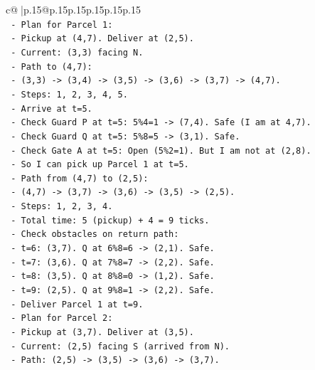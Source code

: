 \documentclass{article}
\begin{document}
{\begin{supertabular}{c@{$\;$}|p{.15\linewidth}@{}p{.15\linewidth}p{.15\linewidth}p{.15\linewidth}p{.15\linewidth}p{.15\linewidth}}
{{{\\ 
\texttt{        {-} Plan for Parcel 1:} \\
\texttt{          {-} Pickup at (4,7). Deliver at (2,5).} \\
\texttt{          {-} Current: (3,3) facing N.} \\
\texttt{          {-} Path to (4,7):} \\
\texttt{            {-} (3,3) {-}> (3,4) {-}> (3,5) {-}> (3,6) {-}> (3,7) {-}> (4,7).} \\
\texttt{            {-} Steps: 1, 2, 3, 4, 5.} \\
\texttt{            {-} Arrive at t=5.} \\
\texttt{            {-} Check Guard P at t=5: 5\%4=1 {-}> (7,4). Safe (I am at 4,7).} \\
\texttt{            {-} Check Guard Q at t=5: 5\%8=5 {-}> (3,1). Safe.} \\
\texttt{            {-} Check Gate A at t=5: Open (5\%2=1). But I am not at (2,8).} \\
\texttt{            {-} So I can pick up Parcel 1 at t=5.} \\
\texttt{          {-} Path from (4,7) to (2,5):} \\
\texttt{            {-} (4,7) {-}> (3,7) {-}> (3,6) {-}> (3,5) {-}> (2,5).} \\
\texttt{            {-} Steps: 1, 2, 3, 4.} \\
\texttt{            {-} Total time: 5 (pickup) + 4 = 9 ticks.} \\
\texttt{            {-} Check obstacles on return path:} \\
\texttt{              {-} t=6: (3,7). Q at 6\%8=6 {-}> (2,1). Safe.} \\
\texttt{              {-} t=7: (3,6). Q at 7\%8=7 {-}> (2,2). Safe.} \\
\texttt{              {-} t=8: (3,5). Q at 8\%8=0 {-}> (1,2). Safe.} \\
\texttt{              {-} t=9: (2,5). Q at 9\%8=1 {-}> (2,2). Safe.} \\
\texttt{            {-} Deliver Parcel 1 at t=9.} \\
\texttt{          {-} Plan for Parcel 2:} \\
\texttt{            {-} Pickup at (3,7). Deliver at (3,5).} \\
\texttt{            {-} Current: (2,5) facing S (arrived from N).} \\
\texttt{            {-} Path: (2,5) {-}> (3,5) {-}> (3,6) {-}> (3,7).} \\
}}}
\end{supertabular}}
\end{document}
